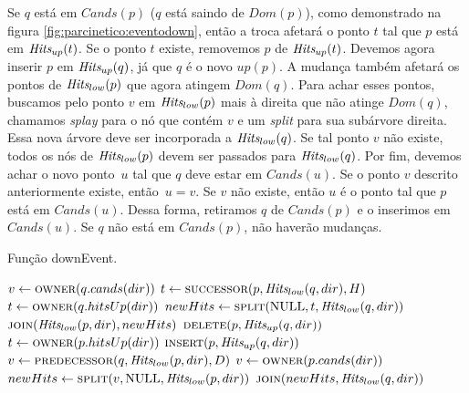 Se $q$ está em $Cands(p)$ ($q$ está saindo de $Dom(p)$), como
demonstrado na figura \ref{fig:parcinetico:eventodown}, então a
troca afetará o ponto $t$ tal que $p$ está em $\textit{Hits}_{up}(t)$. Se o
ponto $t$ existe, removemos $p$ de $\textit{Hits}_{up}(t)$. Devemos agora
inserir $p$ em $\textit{Hits}_{up}(q)$, já que $q$ é o novo $up(p)$. A
mudança também afetará os pontos de $\textit{Hits}_{low}(p)$ que agora
atingem $Dom(q)$. Para achar esses pontos, buscamos pelo ponto $v$
em $\textit{Hits}_{low}(p)$ mais à direita que não atinge $Dom(q)$, chamamos
\textit{splay} para o nó que contém $v$ e um \textit{split} para sua
subárvore direita. Essa nova árvore deve ser incorporada a
$\textit{Hits}_{low}(q)$. Se tal ponto $v$ não existe, todos os nós de
$\textit{Hits}_{low}(p)$ devem ser passados para $\textit{Hits}_{low}(q)$. Por fim,
devemos achar o novo ponto~$u$ tal que $q$ deve estar em $Cands(u)$.
Se o ponto $v$ descrito anteriormente existe, então~$u = v$. Se $v$
não existe, então $u$ é o ponto tal que $p$ está em $Cands(u)$.
Dessa forma, retiramos $q$ de $Cands(p)$ e o inserimos em
$Cands(u)$. Se $q$ não está em $Cands(p)$, não haverão mudanças.
\begin{algorithm}[h]
    \caption{Função downEvent.} \label{par:eventodown}
\begin{algorithmic}[1]
            \State $v \leftarrow \Call{owner}{q.cands(dir)}$
                \State {}
            \EndIf
            \State {}
            \State $t \leftarrow \Call{successor}{p, \Hits_{low}(q, dir), H}$
                \State $t \leftarrow \Call{owner}{q.hitsUp(dir)}$
            \EndIf
            \State $newHits \leftarrow \Call{split}{\Null, t, \Hits_{low}(q, dir)}$
            \State $\Call{join}{\Hits_{low}(p, dir), newHits}$
            \State $\Call{delete}{p, \Hits_{up}(q, dir)}$
                \State {}
            \EndIf
        \Else
                \State $t \leftarrow \Call{owner}{p.hitsUp(dir)}$
                    \State {}
                \EndIf
                \State $\Call{insert}{p, \Hits_{up}(q, dir)}$
                \State $v \leftarrow \Call{predecessor}{q, \Hits_{low}(p, dir), D}$
                    \State $v \leftarrow \Call{owner}{p.cands(dir)}$
                \EndIf
                \State $newHits \leftarrow \Call{split}{v, \Null, \Hits_{low}(p,dir)}$
                \State $\Call{join}{newHits, \Hits_{low}(q, dir)}$
                \State {}
                    \State {}
                \EndIf
            \EndIf
        \EndIf
    \EndFunction
\end{algorithmic}
\end{algorithm}
